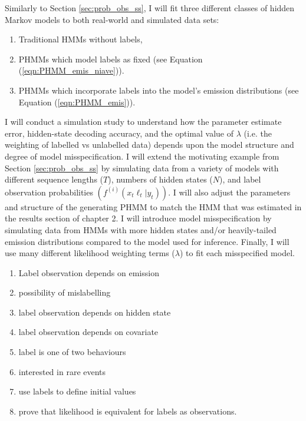 

Similarly to Section \ref{sec:prob_obs_ss}, I will fit three different classes of hidden Markov models to both real-world and simulated data sets:

\begin{enumerate}
    \item Traditional HMMs without labels,
    \item PHMMs which model labels as fixed (see Equation (\ref{eqn:PHMM_emis_niave})).
    \item PHMMs which incorporate labels into the model's emission distributions (see Equation (\ref{eqn:PHMM_emis})).
\end{enumerate}


I will conduct a simulation study to understand how the parameter estimate error, hidden-state decoding accuracy, and the optimal value of $\lambda$ (i.e. the weighting of labelled vs unlabelled data) depends upon the model structure and degree of model misspecification. I will extend the motivating example from Section \ref{sec:prob_obs_ss} by simulating data from a variety of models with different sequence lengths ($T$), numbers of hidden states ($N$), and label observation probabilities $\left(f^{(i)}(x_t\ell_t|y_t)\right)$. I will also adjust the parameters and structure of the generating PHMM to match the HMM that was estimated in the results section of chapter 2. I will introduce model misspecification by simulating data from HMMs with more hidden states and/or heavily-tailed emission distributions compared to the model used for inference. Finally, I will use many different likelihood weighting terms ($\lambda$) to fit each misspecified model.

\begin{enumerate}
    \item Label observation depends on emission
    \item possibility of mislabelling
    \item label observation depends on hidden state
    \item label observation depends on covariate
    \item label is one of two behaviours
    \item interested in rare events
    \item use labels to define initial values
    \item prove that likelihood is equivalent for labels as observations.
\end{enumerate}

